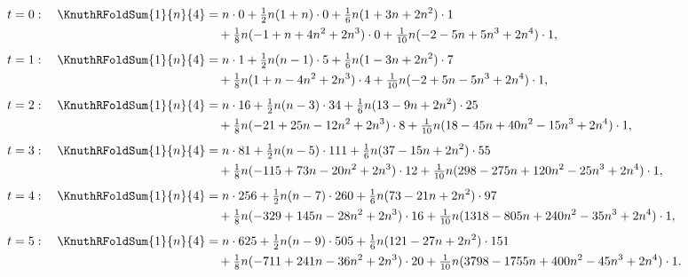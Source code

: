 \begin{example} 
  \begin{align*}
    t=0:\quad
    \KnuthRFoldSum{1}{n}{4}
    &= n\cdot0 + \tfrac12 n(1+n)\cdot0 + \tfrac16 n(1+3n+2n^2)\cdot1
    \\
    &\quad + \tfrac18 n(-1+n+4n^2+2n^3)\cdot0
    + \tfrac1{10} n(-2-5n+5n^3+2n^4)\cdot1,
    \\[4pt]
    t=1:\quad
    \KnuthRFoldSum{1}{n}{4}
    &= n\cdot1 + \tfrac12 n(n-1)\cdot5 + \tfrac16 n(1-3n+2n^2)\cdot7
    \\
    &\quad + \tfrac18 n(1+n-4n^2+2n^3)\cdot4
    + \tfrac1{10} n(-2+5n-5n^3+2n^4)\cdot1,
    \\[4pt]
    t=2:\quad
    \KnuthRFoldSum{1}{n}{4}
    &= n\cdot16 + \tfrac12 n(n-3)\cdot34 + \tfrac16 n(13-9n+2n^2)\cdot25
    \\
    &\quad + \tfrac18 n(-21+25n-12n^2+2n^3)\cdot8
    + \tfrac1{10} n(18-45n+40n^2-15n^3+2n^4)\cdot1,
    \\[4pt]
    t=3:\quad
    \KnuthRFoldSum{1}{n}{4}
    &= n\cdot81 + \tfrac12 n(n-5)\cdot111 + \tfrac16 n(37-15n+2n^2)\cdot55
    \\
    &\quad + \tfrac18 n(-115+73n-20n^2+2n^3)\cdot12
    + \tfrac1{10} n(298-275n+120n^2-25n^3+2n^4)\cdot1,
    \\[4pt]
    t=4:\quad
    \KnuthRFoldSum{1}{n}{4}
    &= n\cdot256 + \tfrac12 n(n-7)\cdot260 + \tfrac16 n(73-21n+2n^2)\cdot97
    \\
    &\quad + \tfrac18 n(-329+145n-28n^2+2n^3)\cdot16
    + \tfrac1{10} n(1318-805n+240n^2-35n^3+2n^4)\cdot1,
    \\[4pt]
    t=5:\quad
    \KnuthRFoldSum{1}{n}{4}
    &= n\cdot625 + \tfrac12 n(n-9)\cdot505 + \tfrac16 n(121-27n+2n^2)\cdot151
    \\
    &\quad + \tfrac18 n(-711+241n-36n^2+2n^3)\cdot20
    + \tfrac1{10} n(3798-1755n+400n^2-45n^3+2n^4)\cdot1.
  \end{align*}
\end{example}
